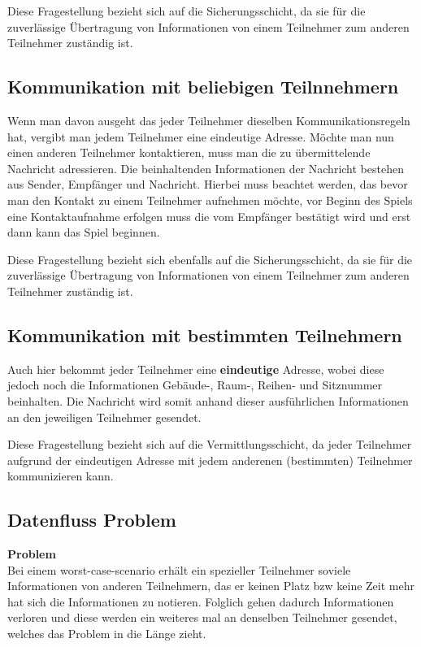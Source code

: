 \documentclass{scrartcl}
\begin{document}
   Diese Fragestellung bezieht sich auf die Sicherungsschicht, da sie für die zuverlässige Übertragung von Informationen von einem Teilnehmer zum anderen Teilnehmer zuständig ist.
   
    \subsection[Aufgabe 7 Kommunikation mit beliebigen Teilnnehmern]{Kommunikation mit beliebigen Teilnnehmern}
    
    Wenn man davon ausgeht das jeder Teilnehmer dieselben Kommunikationsregeln hat, vergibt man jedem Teilnehmer eine eindeutige Adresse. Möchte man nun einen anderen Teilnehmer kontaktieren, muss man die zu übermittelende Nachricht adressieren. Die beinhaltenden Informationen der Nachricht bestehen aus Sender, Empfänger und Nachricht. Hierbei muss beachtet werden, das bevor man den Kontakt zu einem Teilnehmer aufnehmen möchte, vor Beginn des Spiels eine Kontaktaufnahme erfolgen muss die vom Empfänger bestätigt wird und erst dann kann das Spiel beginnen.
    
    Diese Fragestellung bezieht sich ebenfalls auf die Sicherungsschicht, da sie für die zuverlässige Übertragung von Informationen von einem Teilnehmer zum anderen Teilnehmer zuständig ist.
    
    \subsection[Aufgabe 8 Kommunikation mit bestimmten Teilnehmern]{Kommunikation mit bestimmten Teilnehmern}
    
    Auch hier bekommt jeder Teilnehmer eine \textbf{eindeutige} Adresse, wobei diese jedoch noch die Informationen Gebäude-, Raum-, Reihen- und Sitznummer beinhalten. Die Nachricht wird somit anhand dieser ausführlichen Informationen an den jeweiligen Teilnehmer gesendet.
    
    Diese Fragestellung bezieht sich auf die Vermittlungsschicht, da jeder Teilnehmer aufgrund der eindeutigen Adresse mit jedem anderenen (bestimmten) Teilnehmer kommunizieren kann.
    
     \subsection[Aufgabe 9 Datenfluss Problem]{Datenfluss Problem}
     
     \textbf{Problem}\\
     Bei einem worst-case-scenario erhält ein spezieller Teilnehmer soviele Informationen von anderen Teilnehmern, das er keinen Platz bzw keine Zeit mehr hat sich die Informationen zu notieren. Folglich gehen dadurch Informationen verloren und diese werden ein weiteres mal an denselben Teilnehmer gesendet, welches das Problem in die Länge zieht.
     
\end{document}
